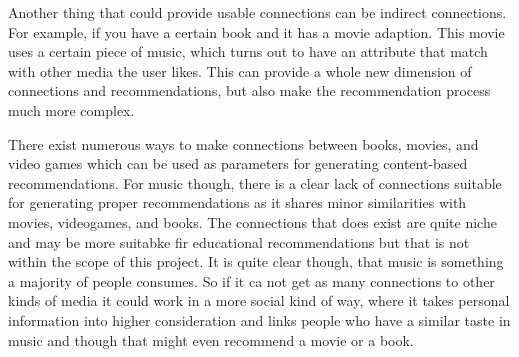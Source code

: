 Another thing that could provide usable connections can be indirect connections. For example, if you have a certain book and it has a movie adaption. This movie uses a certain piece of music, which turns out to have an attribute that match with other media the user likes. This can provide a whole new dimension of connections and recommendations, but also make the recommendation process much more complex.

There exist numerous ways to make connections between books, movies, and video games which can be used as parameters for generating content-based recommendations. For music though, there is a clear lack of connections suitable for generating proper recommendations as it shares minor similarities with movies, videogames, and books. The connections that does exist are quite niche and may be more suitabke fir educational recommendations but that is not within the scope of this project. It is quite clear though, that music is something a majority of people consumes. So if it ca not get as many connections to other kinds of media it could work in a more social kind of way, where it takes personal information into higher consideration and links people who have a similar taste in music and though that might even recommend a movie or a book.